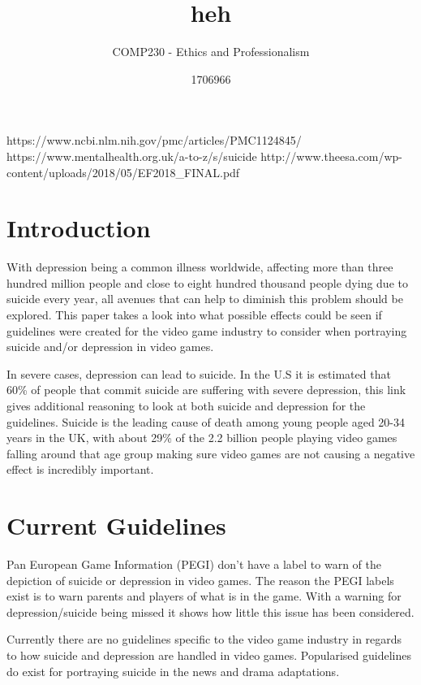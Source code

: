 \documentclass{scrartcl}
\title{heh}
\subtitle{COMP230 - Ethics and Professionalism}
\author{1706966}
\begin{document}
	
https://www.ncbi.nlm.nih.gov/pmc/articles/PMC1124845/	
https://www.mentalhealth.org.uk/a-to-z/s/suicide
http://www.theesa.com/wp-content/uploads/2018/05/EF2018_FINAL.pdf
	
	\maketitle
	
	\abstract{}
	
	\section{Introduction}
		With depression being a common illness worldwide, affecting more than three hundred million people and close to eight hundred thousand people dying due to suicide every year\cite{DepressionStats}, all avenues that can help to diminish this problem should be explored. This paper takes a look into what possible effects could be seen if guidelines were created for the video game industry to consider when portraying suicide and/or depression in video games.
		
		In severe cases, depression can lead to suicide. In the U.S it is estimated that 60\% of people that commit suicide are suffering with severe depression\cite{SuicideToDepression}, this link gives additional reasoning to look at both suicide and depression for the guidelines. Suicide is the leading cause of death among young people aged 20-34 years in the UK\cite{youngAge}, with about 29\%\cite{sales2018essential} of the 2.2 billion\cite{globalGame} people playing video games falling around that age group making sure video games are not causing a negative effect is incredibly important.
	
	\section{Current Guidelines}
	Pan European Game Information (PEGI) don't have a label to warn of the depiction of suicide or depression in video games\cite{pegiNoRating}. The reason the PEGI labels exist is to warn parents and players of what is in the game. With a warning for depression/suicide being missed it shows how little this issue has been considered.\vspace{5mm} %
	
	Currently there are no guidelines specific to the video game industry in regards to how suicide and depression are handled in video games. Popularised guidelines do exist for portraying suicide in the news\cite{world2017preventing}\cite{nepon2009media} and drama adaptations\cite{DramaGuidelines}. \vspace{5mm} %
	
\end{document}
